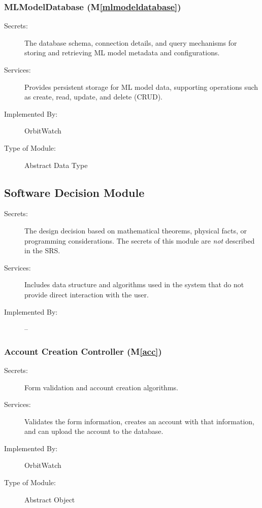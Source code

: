 \documentclass[12pt, titlepage]{article}
\newcommand{\mref}[1]{M\ref{#1}}
\begin{document}
\subsubsection{MLModelDatabase (\mref{mlmodeldatabase})}
\begin{description}
  \item[Secrets:] 
    The database schema, connection details, and query mechanisms for storing and 
    retrieving ML model metadata and configurations.
  \item[Services:] 
    Provides persistent storage for ML model data, supporting operations such as 
    create, read, update, and delete (CRUD).
  \item[Implemented By:] 
    OrbitWatch
  \item[Type of Module:] 
    Abstract Data Type
\end{description}


\subsection{Software Decision Module}

\begin{description}
\item[Secrets:] The design decision based on mathematical theorems, physical
  facts, or programming considerations. The secrets of this module are
  \emph{not} described in the SRS.
\item[Services:] Includes data structure and algorithms used in the system that
  do not provide direct interaction with the user. 
\item[Implemented By:] --
\end{description}

\subsubsection{Account Creation Controller (\mref{acc})}

\begin{description}
\item[Secrets:] Form validation and account creation algorithms.
\item[Services:] Validates the form information, creates an account with that information, and can upload the account to the database.
\item[Implemented By:] OrbitWatch
\item[Type of Module:] Abstract Object
\end{description}
\end{document}
